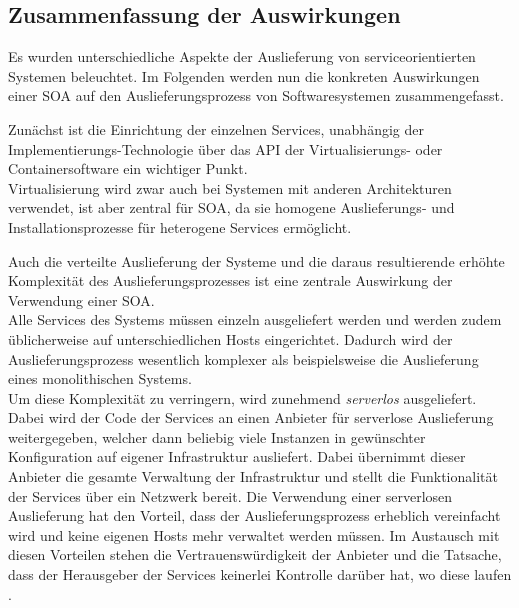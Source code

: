 \subsection{Zusammenfassung der Auswirkungen}
\label{sec:deploymentSummary}
Es wurden unterschiedliche Aspekte der Auslieferung von serviceorientierten Systemen beleuchtet. Im Folgenden werden nun die konkreten Auswirkungen einer SOA auf den Auslieferungsprozess von Softwaresystemen zusammengefasst.

Zunächst ist die Einrichtung der einzelnen Services, unabhängig der Implementierungs-Technologie über das API der Virtualisierungs- oder Containersoftware ein wichtiger Punkt.\\
Virtualisierung wird zwar auch bei Systemen mit anderen Architekturen verwendet, ist aber zentral für SOA, da sie homogene Auslieferungs- und Installationsprozesse für heterogene Services ermöglicht.

Auch die verteilte Auslieferung der Systeme und die daraus resultierende erhöhte Komplexität des Auslieferungsprozesses ist eine zentrale Auswirkung der Verwendung einer SOA.\\
Alle Services des Systems müssen einzeln ausgeliefert werden und werden zudem üblicherweise auf unterschiedlichen Hosts eingerichtet. Dadurch wird der Auslieferungsprozess wesentlich komplexer als beispielsweise die Auslieferung eines monolithischen Systems.\\
Um diese Komplexität zu verringern, wird zunehmend \textit{serverlos} ausgeliefert. Dabei wird der Code der Services an einen Anbieter für serverlose Auslieferung weitergegeben, welcher dann beliebig viele Instanzen in gewünschter Konfiguration auf eigener Infrastruktur ausliefert. Dabei übernimmt dieser Anbieter die gesamte Verwaltung der Infrastruktur und stellt die Funktionalität der Services über ein Netzwerk bereit. Die Verwendung einer serverlosen Auslieferung hat den Vorteil, dass der Auslieferungsprozess erheblich vereinfacht wird und keine eigenen Hosts mehr verwaltet werden müssen. Im Austausch mit diesen Vorteilen stehen die Vertrauenswürdigkeit der Anbieter und die Tatsache, dass der Herausgeber der Services keinerlei Kontrolle darüber hat, wo diese laufen \cite{STORZ.2021}.

